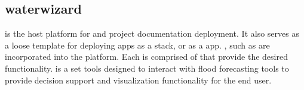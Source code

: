 \documentclass[letterpaper,12pt,english,openany,oneside]{sphinxmanual}
\begin{document}
\sphinxstepscope


\subsection{waterwizard}
\label{\detokenize{euidev/development/_autosummary/waterwizard:module-waterwizard}}\label{\detokenize{euidev/development/_autosummary/waterwizard:waterwizard}}\label{\detokenize{euidev/development/_autosummary/waterwizard::doc}}
\sphinxAtStartPar
{\hyperref[\detokenize{_static/glossary:term-Water-Wizard}]{}} is the host platform for  and project documentation deployment. It also serves as a loose template for deploying {\hyperref[\detokenize{_static/glossary:term-Django}]{}} apps as a {\hyperref[\detokenize{_static/glossary:term-Docker}]{}} stack, or as a {\hyperref[\detokenize{_static/glossary:term-K8s}]{}} app. , such as {\hyperref[\detokenize{_static/glossary:term-Spyce}]{}}  are incorporated into the {\hyperref[\detokenize{_static/glossary:term-Water-Wizard}]{}} platform. Each  is comprised of  that provide the desired functionality.  is a set tools designed to interact with flood forecasting tools to provide decision support and visualization functionality for the end user.

\sphinxstepscope
\end{document}
